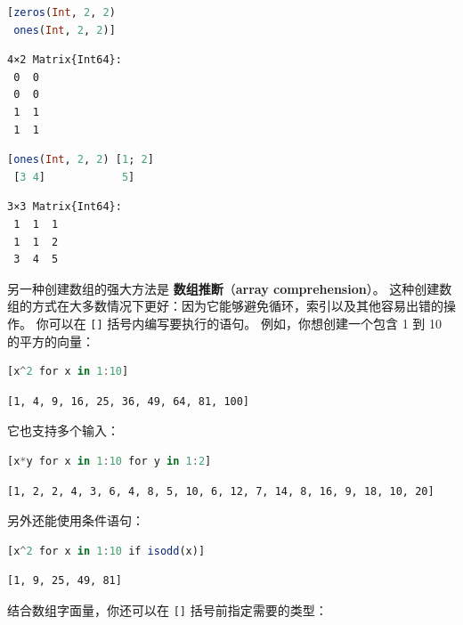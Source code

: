 \documentclass[
  notoc %
]{tufte-book}
\newcommand{\passthrough}[1]{#1}
\begin{document}
\begin{lstlisting}[language=Julia]
[zeros(Int, 2, 2)
 ones(Int, 2, 2)]
\end{lstlisting}

\begin{lstlisting}[language=Output]
4×2 Matrix{Int64}:
 0  0
 0  0
 1  1
 1  1
\end{lstlisting}

\begin{lstlisting}[language=Julia]
[ones(Int, 2, 2) [1; 2]
 [3 4]            5]
\end{lstlisting}

\begin{lstlisting}[language=Output]
3×3 Matrix{Int64}:
 1  1  1
 1  1  2
 3  4  5
\end{lstlisting}

另一种创建数组的强大方法是 \textbf{数组推断}（\textbf{array
comprehension}）。
这种创建数组的方式在大多数情况下更好：因为它能够避免循环，索引以及其他容易出错的操作。
你可以在 \passthrough{\lstinline![]!} 括号内编写要执行的语句。
例如，你想创建一个包含 1 到 10 的平方的向量：

\begin{lstlisting}[language=Julia]
[x^2 for x in 1:10]
\end{lstlisting}

\begin{lstlisting}[language=Output]
[1, 4, 9, 16, 25, 36, 49, 64, 81, 100]
\end{lstlisting}

它也支持多个输入：

\begin{lstlisting}[language=Julia]
[x*y for x in 1:10 for y in 1:2]
\end{lstlisting}

\begin{lstlisting}[language=Output]
[1, 2, 2, 4, 3, 6, 4, 8, 5, 10, 6, 12, 7, 14, 8, 16, 9, 18, 10, 20]
\end{lstlisting}

另外还能使用条件语句：

\begin{lstlisting}[language=Julia]
[x^2 for x in 1:10 if isodd(x)]
\end{lstlisting}

\begin{lstlisting}[language=Output]
[1, 9, 25, 49, 81]
\end{lstlisting}

结合数组字面量，你还可以在 \passthrough{\lstinline![]!}
括号前指定需要的类型：
\end{document}
